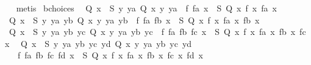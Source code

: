 \begin{isabellebody}
%
\isadelimproof
\ \ %
\endisadelimproof
%
\isatagproof
{}\isamarkupfalse%
\ metis{\isacharplus}{\kern0pt}%
\endisatagproof
{\isafoldproof}%
%
\isadelimproof
\isanewline
%
\endisadelimproof
\isanewline
{}\isamarkupfalse%
\ bchoices{\isacharcolon}{\kern0pt}\isanewline
\ \ {\isachardoublequoteopen}{\isasymAnd}Q{\isachardot}{\kern0pt}\ {\isasymforall}x\ {\isasymin}\ S{\isachardot}{\kern0pt}\ {\isasymexists}y\ ya{\isachardot}{\kern0pt}\ Q\ x\ y\ ya\ {\isasymLongrightarrow}\ {\isasymexists}f\ fa{\isachardot}{\kern0pt}\ {\isasymforall}x\ {\isasymin}\ S{\isachardot}{\kern0pt}\ Q\ x\ {\isacharparenleft}{\kern0pt}f\ x{\isacharparenright}{\kern0pt}\ {\isacharparenleft}{\kern0pt}fa\ x{\isacharparenright}{\kern0pt}{\isachardoublequoteclose}\isanewline
\ \ {\isachardoublequoteopen}{\isasymAnd}Q{\isachardot}{\kern0pt}\ {\isasymforall}x\ {\isasymin}\ S{\isachardot}{\kern0pt}\ {\isasymexists}y\ ya\ yb{\isachardot}{\kern0pt}\ Q\ x\ y\ ya\ yb\ {\isasymLongrightarrow}\ {\isasymexists}f\ fa\ fb{\isachardot}{\kern0pt}\ {\isasymforall}x\ {\isasymin}\ S{\isachardot}{\kern0pt}\ Q\ x\ {\isacharparenleft}{\kern0pt}f\ x{\isacharparenright}{\kern0pt}\ {\isacharparenleft}{\kern0pt}fa\ x{\isacharparenright}{\kern0pt}\ {\isacharparenleft}{\kern0pt}fb\ x{\isacharparenright}{\kern0pt}{\isachardoublequoteclose}\isanewline
\ \ {\isachardoublequoteopen}{\isasymAnd}Q{\isachardot}{\kern0pt}\ {\isasymforall}x\ {\isasymin}\ S{\isachardot}{\kern0pt}\ {\isasymexists}y\ ya\ yb\ yc{\isachardot}{\kern0pt}\ Q\ x\ y\ ya\ yb\ yc\ {\isasymLongrightarrow}\ {\isasymexists}f\ fa\ fb\ fc{\isachardot}{\kern0pt}\ {\isasymforall}x\ {\isasymin}\ S{\isachardot}{\kern0pt}\ Q\ x\ {\isacharparenleft}{\kern0pt}f\ x{\isacharparenright}{\kern0pt}\ {\isacharparenleft}{\kern0pt}fa\ x{\isacharparenright}{\kern0pt}\ {\isacharparenleft}{\kern0pt}fb\ x{\isacharparenright}{\kern0pt}\ {\isacharparenleft}{\kern0pt}fc\ x{\isacharparenright}{\kern0pt}{\isachardoublequoteclose}\isanewline
\ \ {\isachardoublequoteopen}{\isasymAnd}Q{\isachardot}{\kern0pt}\ {\isasymforall}x\ {\isasymin}\ S{\isachardot}{\kern0pt}\ {\isasymexists}y\ ya\ yb\ yc\ yd{\isachardot}{\kern0pt}\ Q\ x\ y\ ya\ yb\ yc\ yd\ {\isasymLongrightarrow}\isanewline
\ \ \ \ {\isasymexists}f\ fa\ fb\ fc\ fd{\isachardot}{\kern0pt}\ {\isasymforall}x\ {\isasymin}\ S{\isachardot}{\kern0pt}\ Q\ x\ {\isacharparenleft}{\kern0pt}f\ x{\isacharparenright}{\kern0pt}\ {\isacharparenleft}{\kern0pt}fa\ x{\isacharparenright}{\kern0pt}\ {\isacharparenleft}{\kern0pt}fb\ x{\isacharparenright}{\kern0pt}\ {\isacharparenleft}{\kern0pt}fc\ x{\isacharparenright}{\kern0pt}\ {\isacharparenleft}{\kern0pt}fd\ x{\isacharparenright}{\kern0pt}{\isachardoublequoteclose}\isanewline

\end{isabellebody}
